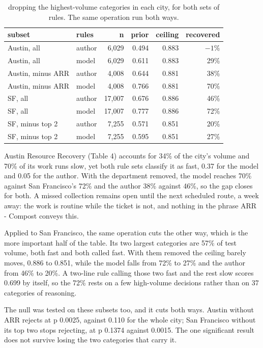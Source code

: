 \documentclass[10pt,a4paper,twocolumn]{article}
\begin{document}
\begin{table}[t]
\centering
\footnotesize
\begin{tabular}{llrrrr}
\toprule
subset & rules & n & prior & ceiling & recovered \\
\midrule
Austin, all & author & 6,029 & 0.494 & 0.883 & $-1\%$ \\
Austin, all & model & 6,029 & 0.611 & 0.883 & 29\% \\
Austin, minus ARR & author & 4,008 & 0.644 & 0.881 & 38\% \\
Austin, minus ARR & model & 4,008 & 0.766 & 0.881 & 70\% \\
SF, all & author & 17,007 & 0.676 & 0.886 & 46\% \\
SF, all & model & 17,007 & 0.777 & 0.886 & 72\% \\
SF, minus top 2 & author & 7,255 & 0.571 & 0.851 & 20\% \\
SF, minus top 2 & model & 7,255 & 0.595 & 0.851 & 27\% \\
\bottomrule
\end{tabular}
\caption{dropping the highest-volume categories in each city, for both sets of rules. The same operation run both ways.}
\end{table}

Austin Resource Recovery (Table 4) accounts for 34\% of the city's volume and 70\%
of its work runs slow, yet both rule sets classify it as fast, 0.37 for the
model and 0.05 for the author. With the department removed, the model reaches
70\% against San Francisco's 72\% and the author 38\% against 46\%, so the gap
closes for both. A missed collection remains open until the next scheduled
route, a week away: the work is routine while the ticket is not, and nothing in
the phrase ARR - Compost conveys this.

Applied to San Francisco, the same operation cuts the other way, which is the
more important half of the table. Its two largest categories are 57\% of test
volume, both fast and both called fast. With them removed the ceiling barely
moves, 0.886 to 0.851, while the model falls from 72\% to 27\% and the author from
46\% to 20\%. A two-line rule calling those two fast and the rest slow scores
0.699 by itself, so the 72\% rests on a few high-volume decisions rather than on
37 categories of reasoning.

The null was tested on these subsets too, and it cuts both ways. Austin without
ARR rejects at p 0.0025, against 0.110 for the whole city; San Francisco without
its top two stops rejecting, at p 0.1374 against 0.0015. The one significant
result does not survive losing the two categories that carry it.
\end{document}
